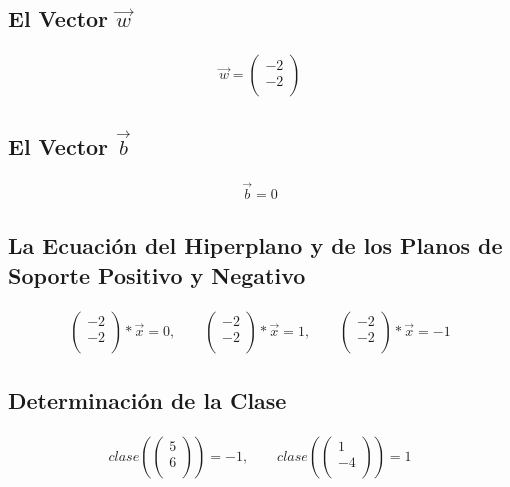 \documentclass[fleqn]{llncs}
\begin{document}
\subsection{El Vector $\overrightarrow{w}$}
\begin{align*}
	\overrightarrow{w} =
		\begin{pmatrix}
			-2 \\
			-2 \\
		\end{pmatrix}
\end{align*}

\subsection{El Vector $\overrightarrow{b}$}
\begin{align*}
	\overrightarrow{b} = 0
\end{align*}

\subsection{La Ecuación del Hiperplano y de los Planos de Soporte Positivo y Negativo}
\begin{align*}
	\begin{pmatrix}
		-2 \\
		-2 \\
	\end{pmatrix} * \overrightarrow{x} = 0,
	\qquad
	\begin{pmatrix}
		-2 \\
		-2 \\
	\end{pmatrix} * \overrightarrow{x} = 1,
	\qquad
	\begin{pmatrix}
		-2 \\
		-2 \\
	\end{pmatrix} * \overrightarrow{x} = -1
\end{align*}

\subsection{Determinación de la Clase}
\begin{align*}
	clase \left(
	\begin{pmatrix}
		5 \\
		6 \\
	\end{pmatrix} \right) = -1,
	\qquad
	clase \left(
	\begin{pmatrix}
		1 \\
		-4 \\
	\end{pmatrix} \right) = 1
\end{align*}
\end{document}
